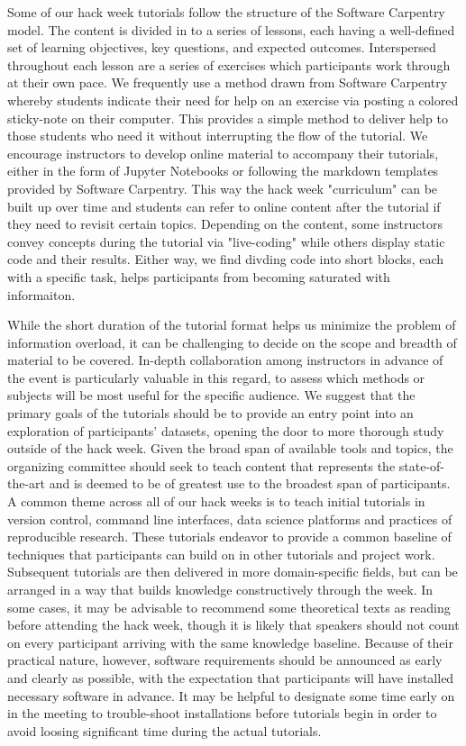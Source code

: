 Some of our hack week tutorials follow the structure of the Software Carpentry model. The content is divided in to a series of lessons, each having a well-defined set of learning objectives, key questions, and expected outcomes. Interspersed throughout each lesson are a series of exercises which participants work through at their own pace. We frequently use a method drawn from Software Carpentry whereby students indicate their need for help on an exercise via posting a colored sticky-note on their computer. This provides a simple method to deliver help to those students who need it without interrupting the flow of the tutorial. We encourage instructors to develop online material to accompany their tutorials, either in the form of Jupyter Notebooks or following the markdown templates provided by Software Carpentry. This way the hack week "curriculum" can be built up over time and students can refer to online content after the tutorial if they need to revisit certain topics. Depending on the content, some instructors convey concepts during the tutorial via "live-coding" while others display static code and their results. Either way, we find divding code into short blocks, each with a specific task, helps participants from becoming saturated with informaiton.

While the short duration of the tutorial format helps us minimize the problem of information overload, it can be challenging to decide on the scope and breadth of material to be covered. In-depth collaboration among instructors in advance of the event is particularly valuable in this regard, to assess which methods or subjects will be most useful for the specific audience. We suggest that the primary goals of the tutorials should be to provide an entry point into an exploration of participants' datasets, opening the door to more thorough study outside of the hack week. Given the broad span of available tools and topics, the organizing committee should seek to teach content that represents the state-of-the-art and is deemed to be of greatest use to the broadest span of participants. A common theme across all of our hack weeks is to teach initial tutorials in version control, command line interfaces, data science platforms and practices of reproducible research. These tutorials endeavor to provide a common baseline of techniques that participants can build on in other tutorials and project work. Subsequent tutorials are then delivered in more domain-specific fields, but can be arranged in a way that builds knowledge constructively through the week. In some cases, it may be advisable to recommend some theoretical texts as reading before attending the hack week, though it is likely that speakers should not count on every participant arriving with the same knowledge baseline. Because of their practical nature, however, software requirements should be announced as early and clearly as possible, with the expectation that participants will have installed necessary software in advance. It may be helpful to designate some time early on in the meeting to trouble-shoot installations before tutorials begin in order to avoid loosing significant time during the actual tutorials.

